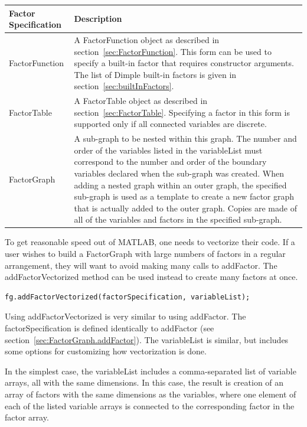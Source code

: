 \fi

\ifjava
\begin{longtable} {l p{10cm}}
Factor Specification & Description \\
\hline
\endhead
%
FactorFunction & A FactorFunction object as described in section~\ref{sec:FactorFunction}. This form can be used to specify a built-in factor that requires constructor arguments.  The list of Dimple built-in factors is given in section~\ref{sec:builtInFactors}.\\
%
FactorTable & A FactorTable object as described in section~\ref{sec:FactorTable}.  Specifying a factor in this form is supported only if all connected variables are discrete. \\
%
FactorGraph & A sub-graph to be nested within this graph.  The number and order of the variables listed in the variableList must correspond to the number and order of the boundary variables declared when the sub-graph was created.  When adding a nested graph within an outer graph, the specified sub-graph is used as a template to create a new factor graph that is actually added to the outer graph.  Copies are made of all of the variables and factors in the specified sub-graph. \\
\end{longtable} 

\fi


\ifmatlab
{}
\label{sec:FactorGraph.addFactorVectorized}

To get reasonable speed out of MATLAB, one needs to vectorize their code.  If a user wishes to build a FactorGraph with large numbers of factors in a regular arrangement, they will want to avoid making many calls to addFactor.  The addFactorVectorized method can be used instead to create many factors at once.

\begin{lstlisting}
fg.addFactorVectorized(factorSpecification, variableList);
\end{lstlisting}

Using addFactorVectorized is very similar to using addFactor.  The factorSpecification is defined identically to addFactor (see section~\ref{sec:FactorGraph.addFactor}). The variableList is similar, but includes some options for customizing how vectorization is done.

In the simplest case, the variableList includes a comma-separated list of variable arrays, all with the same dimensions.  In this case, the result is creation of an array of factors with the same dimensions as the variables, where one element of each of the listed variable arrays is connected to the corresponding factor in the factor array.


